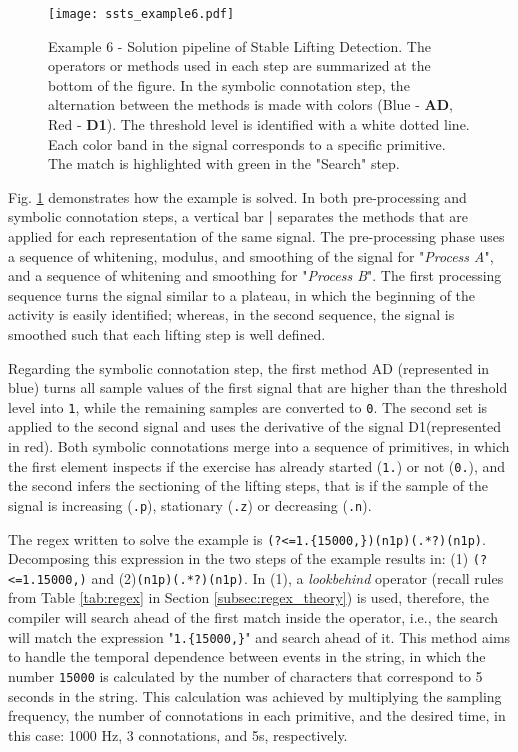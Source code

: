 \begin{figure}
  \centering
      \texttt{[image: ssts\_example6.pdf]}
  \caption{Example 6 - Solution pipeline of Stable Lifting Detection. The operators or methods used in each step are summarized at the bottom of the figure. In the symbolic connotation step, the alternation between the methods is made with colors (Blue - \textbf{AD}, Red - \textbf{D1}). The threshold level is identified with a white dotted line. Each color band in the signal corresponds to a specific primitive. The match is highlighted with green in the "Search" step.}
  \label{fig:Hard}
\end{figure}

Fig. \ref{fig:Hard} demonstrates how the example is solved. In both pre-processing and symbolic connotation steps, a vertical bar \textbf{|} separates the methods that are applied for each representation of the same signal. The pre-processing phase uses a sequence of whitening, modulus, and smoothing of the signal for "\textit{Process A}", and a sequence of whitening and smoothing for "\textit{Process B}". The first processing sequence turns the signal similar to a plateau, in which the beginning of the activity is easily identified; whereas, in the second sequence, the signal is smoothed such that each lifting step is well defined.
\par
Regarding the symbolic connotation step, the first method AD (represented in blue) turns all sample values of the first signal that are higher than the threshold level into \texttt{1}, while the remaining samples are converted to \texttt{0}. The second set is applied to the second signal and uses the derivative of the signal D1(represented in red). Both symbolic connotations merge into a sequence of primitives, in which the first element inspects if the exercise has already started (\texttt{1.})  or not (\texttt{0.}), and the second infers the sectioning of the lifting steps, that is if the sample of the signal is increasing (\texttt{.p}), stationary (\texttt{.z}) or decreasing (\texttt{.n}).
\par
The \gls{regex} written to solve the example is \texttt{(?<=1.\{15000,\})(n1p)(.*?)}\texttt{(n1p)}. Decomposing this expression in the two steps of the example results in: (1) \texttt{(?<=1.{15000,})} and (2)\texttt{(n1p)(.*?)(n1p)}. In (1), a \textit{lookbehind} operator (recall rules from Table \ref{tab:regex} in Section \ref{subsec:regex_theory}) is used, therefore, the compiler will search ahead of the first match inside the operator, i.e., the search will match the expression "\texttt{1.\{15000,\}}" and search ahead of it. This method aims to handle the temporal dependence between events in the string, in which the number \texttt{15000} is calculated by the number of characters that correspond to 5 seconds in the string. This calculation was achieved by multiplying the sampling frequency, the number of connotations in each primitive, and the desired time, in this case: 1000 Hz, 3 connotations, and 5s, respectively.


